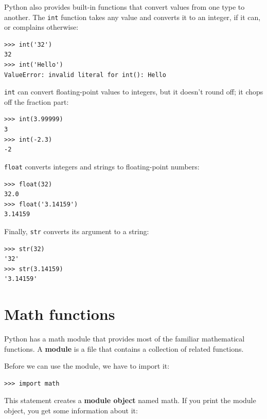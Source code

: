 \documentclass[10pt]{book}
\begin{document}

Python also provides built-in functions that convert values
from one type to another.  The {\tt int} function takes any value and
converts it to an integer, if it can, or complains otherwise:


\beforeverb
\begin{verbatim}
>>> int('32')
32
>>> int('Hello')
ValueError: invalid literal for int(): Hello
\end{verbatim}
\afterverb
%
{\tt int} can convert floating-point values to integers, but it
doesn't round off; it chops off the fraction part:

\beforeverb
\begin{verbatim}
>>> int(3.99999)
3
>>> int(-2.3)
-2
\end{verbatim}
\afterverb
%
{\tt float} converts integers and strings to floating-point
numbers:


\beforeverb
\begin{verbatim}
>>> float(32)
32.0
>>> float('3.14159')
3.14159
\end{verbatim}
\afterverb
%
Finally, {\tt str} converts its argument to a string:


\beforeverb
\begin{verbatim}
>>> str(32)
'32'
>>> str(3.14159)
'3.14159'
\end{verbatim}
\afterverb
%

\section{Math functions}

Python has a math module that provides most of the familiar
mathematical functions.  A {\bf module} is a file that contains a
collection of related functions.


Before we can use the module, we have to import it:

\beforeverb
\begin{verbatim}
>>> import math
\end{verbatim}
\afterverb
%
This statement creates a {\bf module object} named math.  If
you print the module object, you get some information about it:
\end{document}
